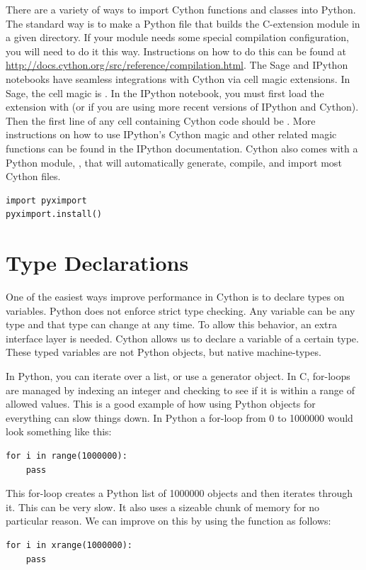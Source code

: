 There are a variety of ways to import Cython functions and classes into Python.
The standard way is to make a Python file that builds the C-extension module in a given directory.
If your module needs some special compilation configuration, you will need to do it this way.
Instructions on how to do this can be found at \url{http://docs.cython.org/src/reference/compilation.html}.
The Sage and IPython notebooks have seamless integrations with Cython via cell magic extensions.
In Sage, the cell magic is .
In the IPython notebook, you must first load the extension with  (or  if you are using more recent versions of IPython and Cython).
Then the first line of any cell containing Cython code should be .
More instructions on how to use IPython's Cython magic and other related magic functions can be found in the IPython documentation.
Cython also comes with a Python module, , that will automatically generate, compile, and import most Cython files.
\begin{lstlisting}
import pyximport
pyximport.install()
\end{lstlisting}

\section*{Type Declarations}
One of the easiest ways improve performance in Cython is to declare types on variables.
Python does not enforce strict type checking.
Any variable can be any type and that type can change at any time.
To allow this behavior, an extra interface layer is needed.
Cython allows us to declare a variable of a certain type.
These typed variables are not Python objects, but native machine-types.

In Python, you can iterate over a list, or use a generator object.
In C, for-loops are managed by indexing an integer and checking to see if it is within a range of allowed values.
This is a good example of how using Python objects for everything can slow things down.
In Python a for-loop from 0 to 1000000 would look something like this:
\begin{lstlisting}
for i in range(1000000):
    pass
\end{lstlisting}
This for-loop creates a Python list of 1000000 objects and then iterates through it.
This can  be very slow.
It also uses a sizeable chunk of memory for no particular reason.
We can improve on this by using the  function as follows:
\begin{lstlisting}
for i in xrange(1000000):
    pass
\end{lstlisting}

